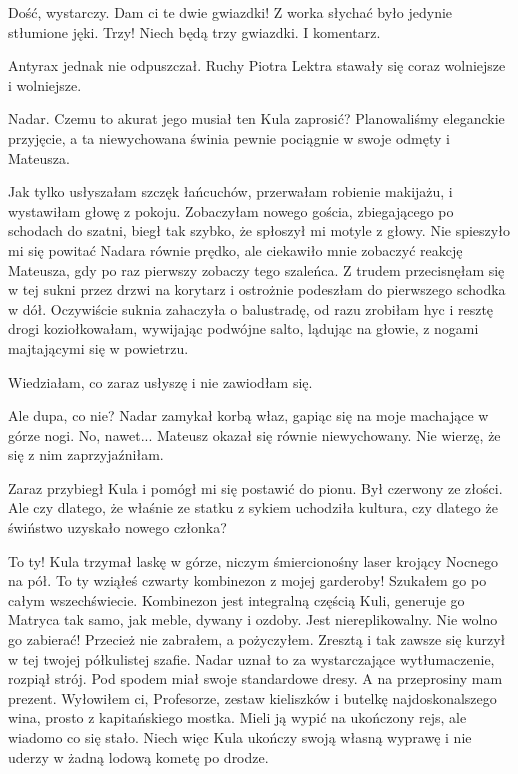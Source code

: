 \begin{dialogue}
\ds{} Dość, wystarczy. Dam ci te dwie gwiazdki! \dm{} Z worka słychać było jedynie stłumione jęki. \dm{} Trzy! Niech będą trzy gwiazdki. I komentarz.
\end{dialogue}

Antyrax jednak nie odpuszczał. Ruchy Piotra Lektra stawały się coraz wolniejsze i wolniejsze.

\divider{}

Nadar. Czemu to akurat jego musiał ten Kula zaprosić?
Planowaliśmy eleganckie przyjęcie, a ta niewychowana świnia pewnie pociągnie w swoje odmęty i Mateusza.

Jak tylko usłyszałam szczęk łańcuchów, przerwałam robienie makijażu, i wystawiłam głowę z pokoju.
Zobaczyłam nowego gościa, zbiegającego po schodach do szatni, biegł tak szybko, że spłoszył mi motyle z głowy.
Nie spieszyło mi się powitać Nadara równie prędko, ale ciekawiło mnie zobaczyć reakcję Mateusza, gdy po raz pierwszy zobaczy tego szaleńca.
Z trudem przecisnęłam się w tej sukni przez drzwi na korytarz i ostrożnie podeszłam do pierwszego schodka w dół.
Oczywiście suknia zahaczyła o balustradę, od razu zrobiłam hyc i resztę drogi koziołkowałam, wywijając podwójne salto, lądując na głowie, z nogami majtającymi się w powietrzu.

Wiedziałam, co zaraz usłyszę i nie zawiodłam się.

\begin{dialogue}
\ds{} Ale dupa, co nie? \dm{} Nadar zamykał korbą właz, gapiąc się na moje machające w górze nogi.
\ds{} No, nawet... \dm{} Mateusz okazał się równie niewychowany. Nie wierzę, że się z nim zaprzyjaźniłam.
\end{dialogue}

Zaraz przybiegł Kula i pomógł mi się postawić do pionu. Był czerwony ze złości.
Ale czy dlatego, że właśnie ze statku z sykiem uchodziła kultura, czy dlatego że świństwo uzyskało nowego członka?

\begin{dialogue}
\ds{} To ty! \dm{} Kula trzymał laskę w górze, niczym śmiercionośny laser krojący Nocnego na pół. \dm{} To ty wziąłeś czwarty kombinezon z mojej garderoby! 
Szukałem go po całym wszechświecie. Kombinezon jest integralną częścią Kuli, generuje go Matryca tak samo, jak meble, dywany i ozdoby.
Jest niereplikowalny. Nie wolno go zabierać!
\ds{} Przecież nie zabrałem, a pożyczyłem. Zresztą i tak zawsze się kurzył w tej twojej półkulistej szafie. \dm{}
Nadar uznał to za wystarczające wytłumaczenie, rozpiął strój. Pod spodem miał swoje standardowe dresy. \dm{} 
A na przeprosiny mam prezent. Wyłowiłem ci, Profesorze, zestaw kieliszków i butelkę najdoskonalszego wina, prosto z kapitańskiego mostka.
Mieli ją wypić na ukończony rejs, ale wiadomo co się stało. Niech więc Kula ukończy swoją własną wyprawę i nie uderzy w żadną lodową kometę po drodze. \de{}
\end{dialogue}

